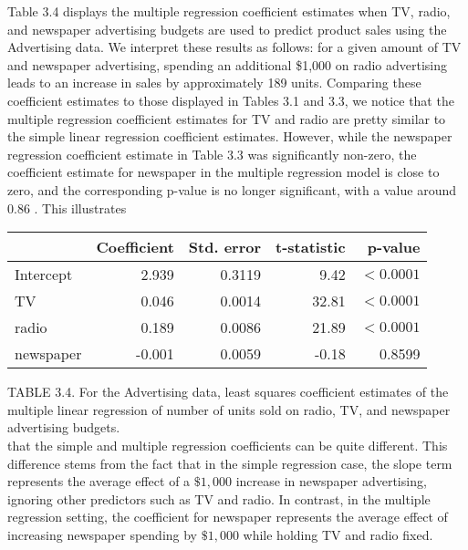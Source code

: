\documentclass[10pt]{article}
\begin{document}
Table 3.4 displays the multiple regression coefficient estimates when TV, radio, and newspaper advertising budgets are used to predict product sales using the Advertising data. We interpret these results as follows: for a given amount of TV and newspaper advertising, spending an additional \$1,000 on radio advertising leads to an increase in sales by approximately 189 units. Comparing these coefficient estimates to those displayed in Tables 3.1 and 3.3, we notice that the multiple regression coefficient estimates for TV and radio are pretty similar to the simple linear regression coefficient estimates. However, while the newspaper regression coefficient estimate in Table 3.3 was significantly non-zero, the coefficient estimate for newspaper in the multiple regression model is close to zero, and the corresponding p-value is no longer significant, with a value around 0.86 . This illustrates


\begin{center}
\begin{tabular}{l|rrrr}
\hline
 & Coefficient & Std. error & t-statistic & p-value \\
\hline
Intercept & 2.939 & 0.3119 & 9.42 & $<0.0001$ \\
TV & 0.046 & 0.0014 & 32.81 & $<0.0001$ \\
radio & 0.189 & 0.0086 & 21.89 & $<0.0001$ \\
newspaper & -0.001 & 0.0059 & -0.18 & 0.8599 \\
\hline
\end{tabular}
\end{center}

TABLE 3.4. For the Advertising data, least squares coefficient estimates of the multiple linear regression of number of units sold on radio, TV, and newspaper advertising budgets.\\
that the simple and multiple regression coefficients can be quite different. This difference stems from the fact that in the simple regression case, the slope term represents the average effect of a $\$ 1,000$ increase in newspaper advertising, ignoring other predictors such as TV and radio. In contrast, in the multiple regression setting, the coefficient for newspaper represents the average effect of increasing newspaper spending by $\$ 1,000$ while holding TV and radio fixed.
\end{document}
